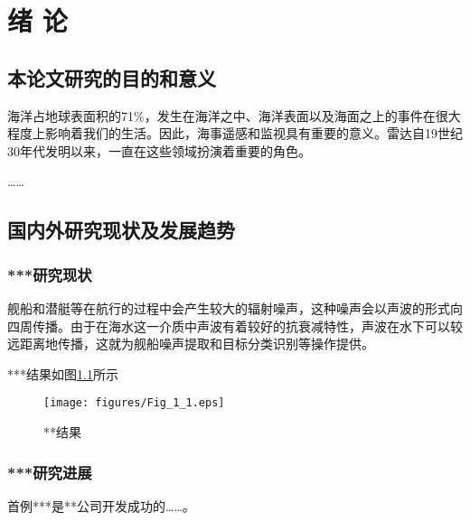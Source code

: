 \chapter{绪 论}
\label{chap:intro}
\section{本论文研究的目的和意义}


海洋占地球表面积的71\%，发生在海洋之中、海洋表面以及海面之上的事件在很大程度上影响着我们的生活。因此，海事遥感和监视具有重要的意义。雷达自19世纪30年代发明以来，一直在这些领域扮演着重要的角色。

……\cite{Takahashi1996Structure,Xia2002Analysis,Jiang1989,Mao2000Motion,Feng1998}

\section{国内外研究现状及发展趋势}


\subsection{***研究现状}

舰船和潜艇等在航行的过程中会产生较大的辐射噪声，这种噪声会以声波的形式向四周传播。由于在海水这一介质中声波有着较好的抗衰减特性，声波在水下可以较远距离地传播，这就为舰船噪声提取和目标分类识别等操作提供\cite{Jiang2005Size}。

***结果如图\ref{fig:diagram}所示

\begin{figure}
 \centering
 \texttt{[image: figures/Fig\_1\_1.eps]}
 \caption{**结果}\label{fig:diagram}
\end{figure}


\subsection{***研究进展}

首例***是**公司开发成功的……。

